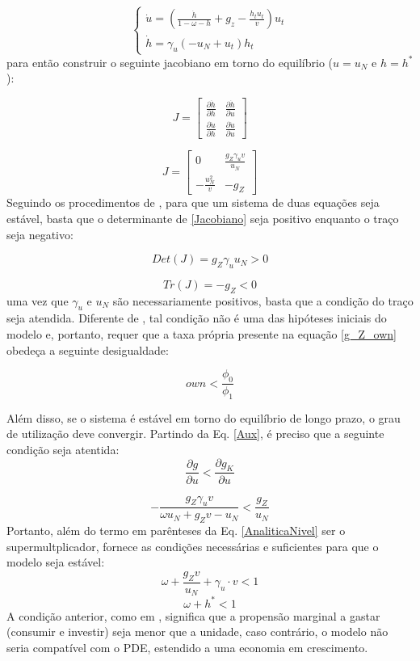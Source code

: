 $$
\begin{cases}
\dot u = \left(\frac{\dot h}{1 - \omega - h} + g_z - \frac{h_t u_t}{v}\right) u_t\\
\dot h = \gamma_{u} \left(- u_N + u_t\right) h_t
\end{cases}
$$
para então construir o seguinte jacobiano em torno do equilíbrio ($u = u_N$ e $h = h^*$):

$$
J = 
\left[\begin{matrix}
\frac{\partial \dot h}{\partial h} & \frac{\partial \dot h}{\partial u}\\
\frac{\partial \dot u}{\partial h} & \frac{\partial \dot u}{\partial u}
\end{matrix}\right]
$$

\begin{equation}
J = 
\label{Jacobiano}
\left[\begin{matrix}0 & \frac{g_Z \gamma_{u} v}{u_N}\\- \frac{u_N^{2}}{v} & - g_Z\end{matrix}\right]
\end{equation}
Seguindo os procedimentos de \textcite{gandolfo_economic_2010}, para que um sistema de duas equações seja estável, basta que o determinante de \ref{Jacobiano} seja positivo enquanto o traço seja negativo:

$$
Det(J) = g_Z \gamma_{u} u_N > 0
$$

$$
Tr(J) = -g_Z < 0
$$
uma vez que $\gamma_u$ e $u_N$ são necessariamente positivos, basta que a condição do traço seja atendida. Diferente de \textcite{freitas_growth_2015}, tal condição não é uma das hipóteses iniciais do modelo e, portanto, requer que a taxa própria presente na equação \ref{g_Z_own} obedeça a seguinte desigualdade:

\begin{equation}
own < \frac{\phi_0}{\phi_1}
\end{equation}

Além disso, se o sistema é estável em torno do equilíbrio de longo prazo, o grau de utilização deve convergir. Partindo da Eq. \ref{Aux}, é preciso que a seguinte condição seja atentida:
$$
\frac{\partial g}{\partial u} < \frac{\partial g_K}{\partial u}
$$

$$
- \frac{g_Z \gamma_{u} v}{\omega u_N + g_Z v - u_N} < \frac{g_Z}{u_N}
$$
Portanto, além do termo em parênteses da Eq. \ref{AnaliticaNivel} ser o supermultplicador, fornece as condições necessárias e suficientes para que o modelo seja estável: 
$$
\omega + \frac{g_Z v}{u_N} + \gamma_u\cdot v < 1
$$
\begin{equation}
\omega + h^* < 1
\end{equation}
A condição anterior, como em \textcite{freitas_growth_2015}, significa que a propensão marginal a gastar (consumir e investir) seja menor que a unidade, caso contrário, 
o modelo não seria compatível com o PDE, estendido a uma economia em crescimento.


